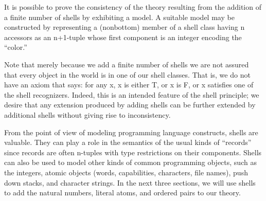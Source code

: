 \documentclass[11pt]{book}
\begin{document}
It is possible to prove the consistency of the theory resulting from
the addition of a finite number of shells by exhibiting a model.
A suitable model may be constructed by representing a (nonbottom)
member of a shell class having n accessors as an n+1-tuple
whose first component is an integer encoding the ``color.''

Note  that merely because we
add a finite number of shells we are not assured that every object
in the world is in one of our shell classes.  That is, we do not have
an axiom that says: for any x, x is either T, or x is F, or x satisfies one
of the shell recognizers.  Indeed, this is an intended feature of the
shell principle; we desire that any extension produced by
adding shells can be further extended by additional shells without
giving rise to inconsistency.

From the point of view of modeling programming language constructs,
shells are  valuable.  They can play a role in
the semantics of the usual kinds of ``records''
since records are often n-tuples with type restrictions on their
components.  Shells can also be used to model
other kinds of common programming objects, such as the integers,
atomic objects (words, capabilities, characters, file names),
push down stacks,  and character strings.  In the next three
sections, we will use shells to add the natural numbers,
literal atoms, and  ordered pairs to our theory.
\end{document}
